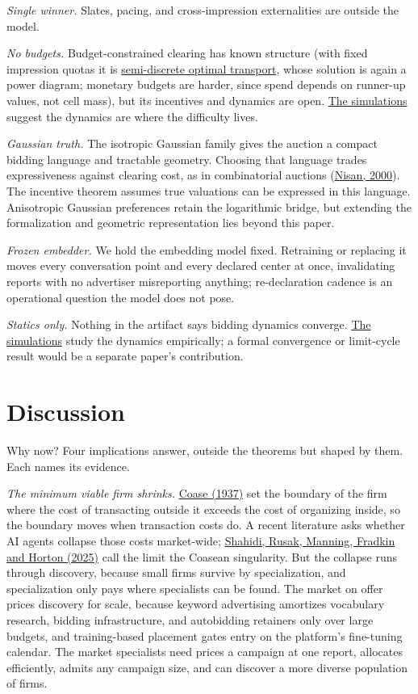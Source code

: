 \emph{Single winner.} Slates, pacing, and cross-impression externalities
are outside the model.

\emph{No budgets.} Budget-constrained clearing has known structure (with
fixed impression quotas it is
\href{https://arxiv.org/abs/2106.14730}{semi-discrete optimal
transport}, whose solution is again a power diagram; monetary budgets
are harder, since spend depends on runner-up values, not cell mass), but
its incentives and dynamics are open. \hyperref[simulations]{The
simulations} suggest the dynamics are where the difficulty lives.

\emph{Gaussian truth.} The isotropic Gaussian family gives the auction a
compact bidding language and tractable geometry. Choosing that language
trades expressiveness against clearing cost, as in combinatorial
auctions (\href{https://doi.org/10.1145/352871.352872}{Nisan, 2000}).
The incentive theorem assumes true valuations can be expressed in this
language. Anisotropic Gaussian preferences retain the logarithmic
bridge, but extending the formalization and geometric representation
lies beyond this paper.

\emph{Frozen embedder.} We hold the embedding model fixed. Retraining or
replacing it moves every conversation point and every declared center at
once, invalidating reports with no advertiser misreporting anything;
re-declaration cadence is an operational question the model does not
pose.

\emph{Statics only.} Nothing in the artifact says bidding dynamics
converge. \hyperref[simulations]{The simulations} study the dynamics
empirically; a formal convergence or limit-cycle result would be a
separate paper's contribution.

\section{Discussion}\label{discussion}

Why now? Four implications answer, outside the theorems but shaped by
them. Each names its evidence.

\emph{The minimum viable firm shrinks.}
\href{https://doi.org/10.1111/j.1468-0335.1937.tb00002.x}{Coase (1937)}
set the boundary of the firm where the cost of transacting outside it
exceeds the cost of organizing inside, so the boundary moves when
transaction costs do. A recent literature asks whether AI agents
collapse those costs market-wide;
\href{https://www.nber.org/books-and-chapters/economics-transformative-ai/coasean-singularity-demand-supply-and-market-design-ai-agents}{Shahidi,
Rusak, Manning, Fradkin and Horton (2025)} call the limit the Coasean
singularity. But the collapse runs through discovery, because small
firms survive by specialization, and specialization only pays where
specialists can be found. The market on offer prices discovery for
scale, because keyword advertising amortizes vocabulary research,
bidding infrastructure, and autobidding retainers only over large
budgets, and training-based placement gates entry on the platform's
fine-tuning calendar. The market specialists need prices a campaign at
one report, allocates efficiently, admits any campaign size, and can
discover a more diverse population of firms.


